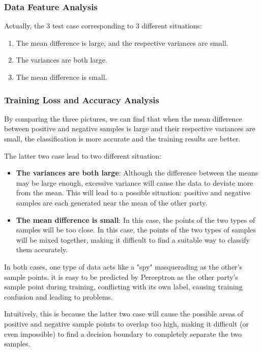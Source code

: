 \documentclass{article}
\begin{document}
\subsubsection{Data Feature Analysis}

Actually, the 3 test case corresponding to 3 different situations:

\begin{enumerate}
    \item The mean difference is large, and the respective variances are small.
    \item The variances are both large.
    \item The mean difference is small.
\end{enumerate}

\subsubsection{Training Loss and Accuracy Analysis}

By comparing the three pictures, we can find that when the mean difference between positive and negative samples is large and their respective variances are small, the classification is more accurate and the training results are better.

The latter two case lead to two different situation:

\begin{itemize}
    \item \textbf{The variances are both large}: Although the difference between the means may be large enough, excessive variance will cause the data to deviate more from the mean. This will lead to a possible situation: positive and negative samples are each generated near the mean of the other party.
    \item \textbf{The mean difference is small}: In this case, the points of the two types of samples will be too close. In this case, the points of the two types of samples will be mixed together, making it difficult to find a suitable way to classify them accurately.
\end{itemize}

In both cases, one type of data acts like a "spy" masquerading as the other's sample points. it is easy to be predicted by Perceptron as the other party's sample point during training, conflicting with its own label, causing training 
 confusion and leading to problems.

Intuitively, this is because the latter two case will cause the possible areas of positive and negative sample points to overlap too high, making it difficult (or even impossible) to find a decision boundary to completely separate the two samples.
\end{document}
